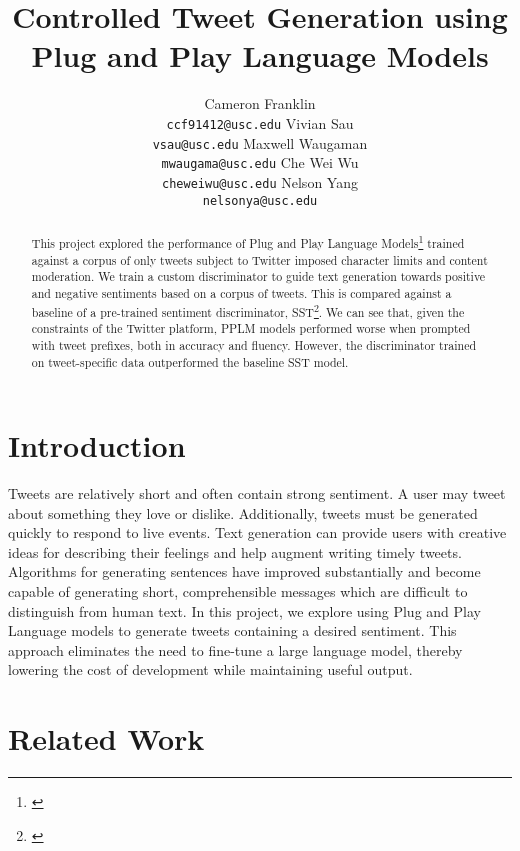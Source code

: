 \documentclass[11pt]{article}
\title{Controlled Tweet Generation using Plug and Play Language Models}
\author{Cameron Franklin \\
\texttt{ccf91412@usc.edu} \And
Vivian Sau \\
\texttt{vsau@usc.edu} \And
Maxwell Waugaman \\
\texttt{mwaugama@usc.edu} \AND
Che Wei Wu \\
\texttt{cheweiwu@usc.edu} \And
Nelson Yang \\
\texttt{nelsonya@usc.edu} \AND
\affil{Department of Computer Science \\
University of Southern California \\
Los Angeles, CA 90089 }}
\begin{document}
{\maketitle}

\begin{abstract}
This project explored the performance of  Plug and Play Language Models\footnote{\citep{pplm-paper}} trained against a corpus of only tweets subject to Twitter imposed character limits and content moderation.  We train a custom discriminator to guide text generation towards positive and negative sentiments based on a corpus of tweets. This is compared against a baseline of a pre-trained sentiment discriminator, SST\footnote{\citep{sst-paper}}.  We can see that, given the constraints of the Twitter platform, PPLM models performed worse when prompted with tweet prefixes, both in accuracy and fluency.  However, the discriminator trained on tweet-specific data outperformed the baseline SST model.
\end{abstract}

\section{Introduction}
Tweets are relatively short and often contain strong sentiment. A user may tweet about something they love or dislike. Additionally, tweets must be generated quickly to respond to live events. Text generation can provide users with creative ideas for describing their feelings and help augment writing timely tweets. Algorithms for generating sentences have improved substantially and become capable of generating short, comprehensible messages which are difficult to distinguish from human text. In this project, we explore using Plug and Play Language models to generate tweets containing a desired sentiment. This approach eliminates the need to fine-tune a large language model, thereby lowering the cost of development while maintaining useful output.


\section{Related Work}
\end{document}
